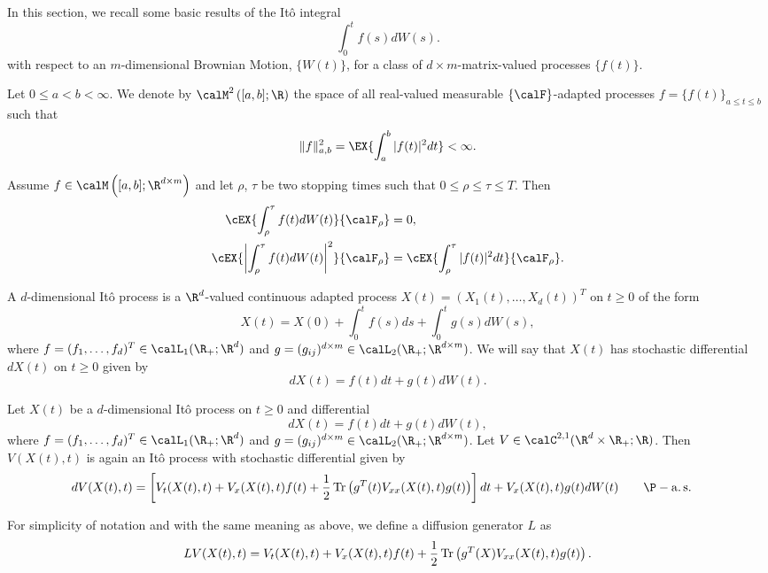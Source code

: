 
	In this section, we recall some basic results of the It\^o integral
$$
	\int_{0}^{t}
		f(s)dW(s).
$$
with respect to an $m$-dimensional Brownian Motion, $\{W(t)\}$, for a class of $d \times m$-matrix-valued processes
$\{f(t)\}$.
\begin{definition} %
	Let $0\leq a<b<\infty$. We denote by $\calM^2\left([a,b];\R \right)$ the space of all real-valued measurable
	$\{\calF\}$-adapted processes $f=\{f(t)\}_{a\leq t\leq b}$ such that
	$$
		\|f\|_{a,b}^2
			=\EX{
				\int_a^b |f(t)|^2dt
				}<\infty.
	$$
\end{definition}
\begin{thm}
	Assume $f\in \calM \left([a,b]; \R^{d\times m}\right)$ and let $\rho$, $\tau$ be two stopping times such that
	$0\leq \rho \leq \tau \leq T$. Then
	\begin{align*}
		\cEX{\int_{\rho}^{\tau} f(t) dW(t)}{\calF_{\rho}}
			& = 0,\\
		\cEX{\left|\int_{\rho}^{\tau} f(t)dW(t) \right|^2}{\calF_{\rho}}
			& = \cEX{\int_{\rho}^{\tau}|f(t)|^2dt }{\calF_{\rho}}.
	\end{align*}
\end{thm}
\begin{definition}[It\^o process]
	A $d$-dimensional It\^o process is a $\R^d$-valued continuous adapted
	process $X(t) = (X_1(t), \dots, X_d(t))^T$ on $t\geq 0$ of the form
	$$
		X(t) = X(0) +  \int_{0}^{t} f(s)ds + \int_{0}^{t} g(s)dW(s),
	$$
	where $f = (f_1,\ldots, f_d)^T \in  \calL_1(\R_+; \R^d)$ and 
	$g = (g_{ij})^{d\times m}\in \calL_2(\R_+; \R^{d\times m})$. We will say that $X(t)$ has stochastic differential 
	$dX(t)$ on $t \geq 0$ given by
	$$
		dX(t) = f(t) dt + g(t)dW(t).
	$$
\end{definition}
%
\begin{thm}
	Let $X(t)$ be a $d$-dimensional It\^o process on $t \geq 0$ and differential
	$$
		dX(t) = f(t) dt + g(t)dW(t),
	$$
	where $f = (f_1,\ldots, f_d)^T \in  \calL_1(\R_+; \R^d)$ and 
	$g = (g_{ij})^{d\times m}\in \calL_2(\R_+; \R^{d\times m})$.
	Let $V\in \calC^{2,1}(\R^d\times \R_+;\R)$. Then $V(X(t),t)$ is again an It\^o process with stochastic differential
	given by
	\begin{align*}
		dV(X(t),t) &=
			\left[
				V_t(X(t),t) + V_x(X(t),t)f(t)
				+\frac{1}{2}
				\Tr
					\left(
						g^T(t) V_{xx}(X(t),t)g(t)
					\right)
			\right]dt
			+
			V_x(X(t),t) g(t)dW(t) \qquad \P-\as
	\end{align*}
\end{thm}
For simplicity of notation and with the same meaning as above, we define a diffusion generator $L$ as
\begin{equation}\label{eqn:DifussionOperator}
LV(X(t),t)=
V_t(X(t),t) + V_x(X(t),t)f(t)
+\frac{1}{2}
\Tr
	\left(
		g^T(X) V_{xx}(X(t), t)g(t)
	\right).
\end{equation}
